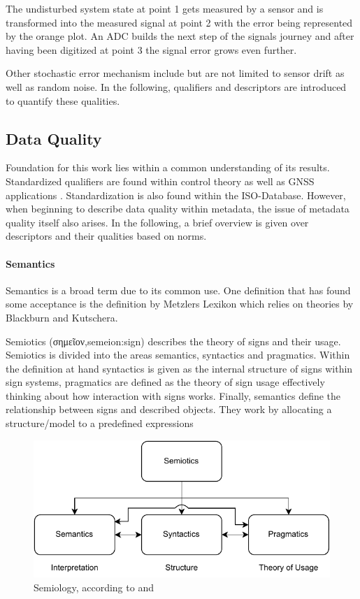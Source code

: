 The undisturbed system state at point 1 gets measured by a sensor and is transformed into the measured signal at point 2 with the error being represented by the orange plot. An ADC builds the next step of the signals journey and after having been digitized at point 3 the signal error grows even further.

Other stochastic error mechanism include but are not limited to sensor drift as well as random noise. In the following, qualifiers and descriptors are introduced to quantify these qualities.

\subsection{Data Quality}

Foundation for this work lies within a common understanding of its results. Standardized qualifiers are found within control theory \cite{isermann_fault-diagnosis_2011} as well as GNSS applications \cite{teunissen_springer_2017}. Standardization is also found within the ISO-Database. However, when beginning to describe data quality within metadata, the issue of metadata quality itself also arises. In the following, a brief overview is given over descriptors and their qualities based on norms.

\paragraph{Semantics}
Semantics is a broad term due to its common use. One definition that has found some acceptance is the definition by Metzlers Lexikon which relies on theories by Blackburn and Kutschera. \cite{shoemaker_spreading_1987,kutschera_sprachphilosophie_1975}


Semiotics (\textgreek{σημεῖον},semeion:sign) describes the theory of signs and their usage. Semiotics is divided into the areas semantics, syntactics and pragmatics. Within the definition at hand syntactics is given as the internal structure of signs within sign systems, pragmatics are defined as the theory of sign usage effectively thinking about how interaction with signs works. Finally, semantics define the relationship between signs and described objects. They work by allocating a structure/model to a predefined expressions

\begin{figure}
    \centering
    \includegraphics[width=.7\textwidth]{03_figures/semiotics.pdf}
    \caption{Semiology, according to \textcite{kutschera_sprachphilosophie_1975} and \textcite{shoemaker_spreading_1987}}
\end{figure}

